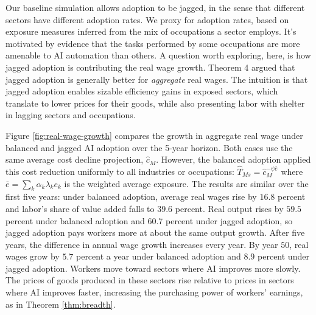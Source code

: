 \documentclass[11pt]{article}
\begin{document}
Our baseline simulation allows adoption to be jagged, in the sense
that different sectors have different adoption rates. We proxy for
adoption rates, based on exposure measures inferred from the mix of
occupations a sector employs. It's motivated by evidence that the
tasks performed by some occupations are more amenable to AI automation
than others. A question worth exploring, here, is how jagged adoption
is contributing the real wage growth. Theorem 4 argued that jagged
adoption is generally better for \emph{aggregate} real wages. The
intuition is that jagged adoption enables sizable efficiency gains
in exposed sectors, which translate to lower prices for their goods,
while also presenting labor with shelter in lagging sectors and occupations.

Figure \ref{fig:real-wage-growth} compares the growth in aggregate
real wage under balanced and jagged AI adoption over the 5-year horizon.
Both cases use the same average cost decline projection, $\hat{c}_{M}$.
However, the balanced adoption applied this cost reduction uniformly
to all industries or occupations: $\hat{T}_{Ms}=\hat{c}^{-\psi\bar{e}}_{M}$
where $\bar{e}=\sum_{k}\alpha_{k}\lambda_{k}e_{k}$ is the weighted
average exposure. The results are similar over the first five years:
under balanced adoption, average real wages rise by $16.8$
percent and labor's share of value added falls to $39.6$
percent. Real output rises by $59.5$
percent under balanced adoption and $60.7$
percent under jagged adoption, so jagged adoption pays workers more
at about the same output growth. After five years, the difference
in annual wage growth increases every year. By year $50$,
real wages grow by $5.7$ percent
a year under balanced adoption and $8.9$
percent under jagged adoption. Workers move toward sectors where AI
improves more slowly. The prices of goods produced in these sectors
rise relative to prices in sectors where AI improves faster, increasing
the purchasing power of workers' earnings, as in Theorem \ref{thm:breadth}.
\end{document}
